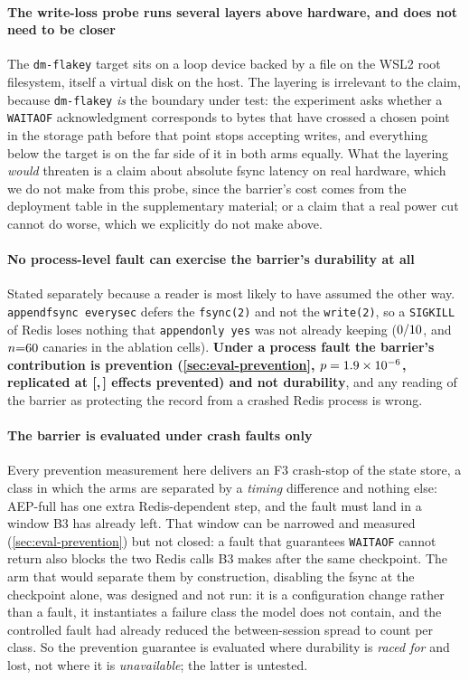 \paragraph{The write-loss probe runs several layers above hardware, and does not
need to be closer} The \texttt{dm-flakey} target sits on a loop device backed by
a file on the WSL2 root filesystem, itself a virtual disk on the host. The
layering is irrelevant to the claim, because \texttt{dm-flakey} \emph{is} the
boundary under test: the experiment asks whether a \texttt{WAITAOF}
acknowledgment corresponds to bytes that have crossed a chosen point in the
storage path before that point stops accepting writes, and everything below the
target is on the far side of it in both arms equally. What the layering
\emph{would} threaten is a claim about absolute fsync latency on real hardware,
which we do not make from this probe, since the barrier's cost comes from
the deployment table in the supplementary material; or a claim that a
real power cut cannot do worse,
which we explicitly do not make above.

\paragraph{No process-level fault can exercise the barrier's durability at all}
Stated separately because a reader is most likely to have assumed the other way.
\texttt{appendfsync everysec} defers the \texttt{fsync(2)} and not the
\texttt{write(2)}, so a \texttt{SIGKILL} of Redis loses nothing that
\texttt{appendonly yes} was not already keeping ($0/10{}$, and
$n{=}60{}$ canaries in the ablation cells). \textbf{Under a process
fault the barrier's contribution is prevention (\cref{sec:eval-prevention},
$p=1.9\times10^{-6}{}$, replicated at
[\ReplicationPreventedLow{},\,\ReplicationPreventedHigh{}] effects prevented)
and not durability}, and any reading of the barrier as protecting the record
from a crashed Redis process is wrong.

\paragraph{The barrier is evaluated under crash faults only} Every prevention
measurement here delivers an F3 crash-stop of the state store, a class in which
the arms are separated by a \emph{timing} difference and nothing else: AEP-full
has one extra Redis-dependent step, and the fault must land in a window B3 has
already left. That window can be narrowed and measured
(\cref{sec:eval-prevention}) but not closed: a fault that guarantees
\texttt{WAITAOF} cannot return also blocks the two Redis calls B3 makes after
the same checkpoint. The arm that would separate them by construction,
disabling the fsync at the checkpoint alone, was designed and not run: it is
a configuration change rather than a fault, it instantiates a failure class the
model does not contain, and the controlled fault had already reduced the
between-session spread to \ArmASpreadMax{} count per class. So the prevention
guarantee is evaluated where durability is \emph{raced for} and lost, not where
it is \emph{unavailable}; the latter is untested.

